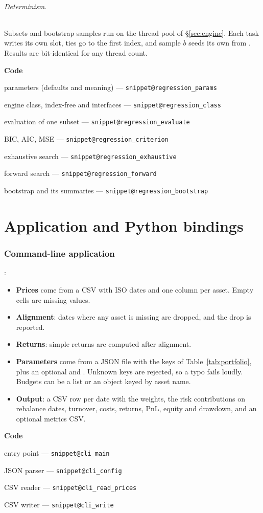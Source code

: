 \documentclass[11pt,a4paper]{article}
\makeatletter
\newcommand{\snippetsource}[1]{\csname snippet@#1\endcsname}
\newcommand{\snippet}[3]{%
  }
\newenvironment{codepointers}{%
  \par\smallskip\begingroup\footnotesize\noindent\textcolor{blue!50!black}{\textbf{Code}}\par\nopagebreak
  \begin{list}{}{\setlength{\leftmargin}{1.2em}\setlength{\itemsep}{0pt}\setlength{\parsep}{0pt}\setlength{\topsep}{1pt}}}%
  {\end{list}\endgroup\smallskip}
\newcommand{\codeitem}[2]{\item #2 --- \texttt{\snippetsource{#1}}}
\makeatother
\begin{document}
\paragraph{Determinism.} Subsets and bootstrap samples run on the thread pool of
\S\ref{sec:engine}. Each task writes its own slot, ties go to the first index, and sample $b$
seeds its own  from . Results are bit-identical
for any thread count.
\snippet{regression_folds}{C++}{Contiguous validation folds with a gap}
\snippet{regression_cv}{C++}{Cross-validation error, standard error and the 1-SE rule}
\snippet{regression_bootstrap_draw}{C++}{One moving block bootstrap sample}
\begin{codepointers}
  \codeitem{regression_params}{parameters (defaults and meaning)}
  \codeitem{regression_class}{engine class, index-free and \code{DataFrame} interfaces}
  \codeitem{regression_evaluate}{evaluation of one subset}
  \codeitem{regression_criterion}{BIC, AIC, MSE}
  \codeitem{regression_exhaustive}{exhaustive search}
  \codeitem{regression_forward}{forward search}
  \codeitem{regression_bootstrap}{bootstrap and its summaries}
\end{codepointers}

\part{Application and Python bindings}

\section{Command-line application}\label{sec:cli}
:
\begin{itemize}
  \item \textbf{Prices} come from a CSV with ISO dates and one column per asset. Empty
        cells are missing values.
  \item \textbf{Alignment}: dates where any asset is missing are dropped, and the drop is
        reported.
  \item \textbf{Returns}: simple returns are computed after alignment.
  \item \textbf{Parameters} come from a JSON file with the keys of
        Table~\ref{tab:portfolio}, plus an optional  and . Unknown
        keys are rejected, so a typo fails loudly. Budgets can be a list or an object keyed
        by asset name.
  \item \textbf{Output}: a CSV row per date with the weights, the risk contributions on
        rebalance dates, turnover, costs, returns, PnL, equity and drawdown, and an optional
        metrics CSV.
\end{itemize}
\begin{codepointers}
  \codeitem{cli_main}{entry point}
  \codeitem{cli_config}{JSON parser}
  \codeitem{cli_read_prices}{CSV reader}
  \codeitem{cli_write}{CSV writer}
\end{codepointers}
\end{document}
